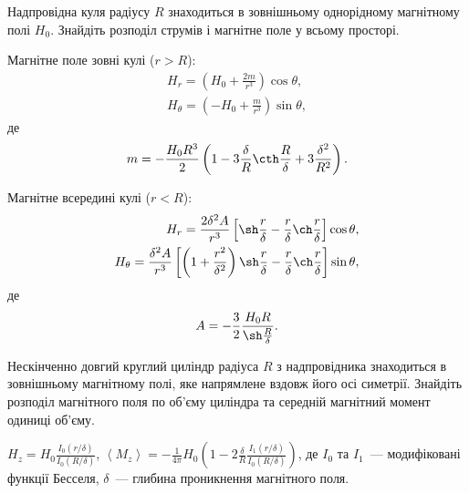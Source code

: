 \begin{problem}
Надпровідна куля радіусу $R$ знаходиться в зовнішньому однорідному магнітному полі $H_0$. Знайдіть розподіл струмів і магнітне поле у всьому просторі.
\begin{solution}
	Магнітне поле зовні кулі ($r > R$):
	\begin{align*}
		H_r = \left( H_0 + \frac{2m}{r^3}\right) \cos\theta, \\
		H_{\theta} = \left( - H_0 + \frac{m}{r^3}\right) \sin\theta,
	\end{align*}
	де
	\[
		m = -\frac{H_0R^3}{2}\left( 1 - 3\frac{\delta}{R}\cth\frac{R}{\delta} + 3\frac{\delta^2}{R^2}\right).
	\]

	Магнітне всередині кулі ($r < R$):
	\begin{align*}
		H_r = \frac{2\delta^2A}{r^3}\left[ \sh\frac{r}{\delta} - \frac{r}{\delta}\ch\frac{r}{\delta}\right]\cos\theta , \\
		H_{\theta} = \frac{\delta^2A}{r^3}\left[ \left( 1+ \frac{r^2}{\delta^2}\right) \sh\frac{r}{\delta} - \frac{r}{\delta}\ch\frac{r}{\delta}\right]\sin\theta,
	\end{align*}
	де
	\[
		A = - \frac32\frac{H_0R}{\sh\frac{R}{\delta} }.
	\]
\end{solution}
\end{problem}

\begin{problem}%
Нескінченно довгий круглий циліндр радіуса $R$ з  надпровідника знаходиться в зовнішньому магнітному полі, яке напрямлене вздовж його осі симетрії. Знайдіть розподіл магнітного поля по об'єму циліндра та середній магнітний момент одиниці об'єму.
\begin{solution}
	$H_z = H_0\frac{I_0(r/\delta)}{I_0(R/\delta)}$,
	$\left\langle M_z\right\rangle  = -\frac{1}{4\pi}H_0\left( 1 - 2\frac{\delta}{R}\frac{I_1(r/\delta)}{I_0(R/\delta)}\right)$,
	де $I_0$ та $I_1$~--- модифіковані функції  Бесселя, $\delta$~--- глибина проникнення магнітного поля.
\end{solution}
\end{problem}

